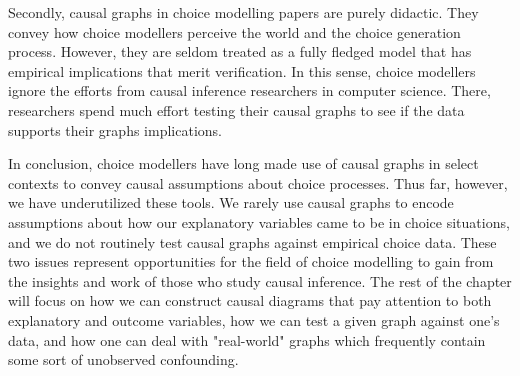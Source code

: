 Secondly, causal graphs in choice modelling papers are purely didactic.
They convey how choice modellers perceive the world and the choice generation process.
However, they are seldom treated as a fully fledged model that has empirical implications that merit verification.
In this sense, choice modellers ignore the efforts from causal inference researchers in computer science.
There, researchers spend much effort testing their causal graphs to see if the data supports their graphs implications.

In conclusion, choice modellers have long made use of causal graphs in select contexts to convey causal assumptions about choice processes.
Thus far, however, we have underutilized these tools.
We rarely use causal graphs to encode assumptions about how our explanatory variables came to be in choice situations, and we do not routinely test causal graphs against empirical choice data.
These two issues represent opportunities for the field of choice modelling to gain from the insights and work of those who study causal inference.
The rest of the chapter will focus on how we can construct causal diagrams that pay attention to both explanatory and outcome variables, how we can test a given graph against one's data, and how one can deal with "real-world" graphs which frequently contain some sort of unobserved confounding.
